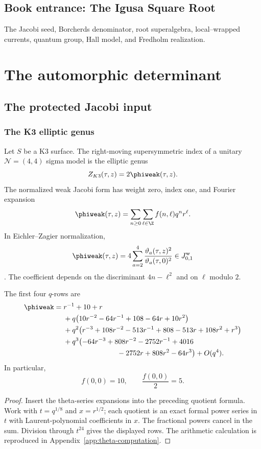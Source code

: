 \cleardoublepage
{}
{}
\chapter*{Book entrance: The Igusa Square Root}
\begin{summarybox}
The Jacobi seed, Borcherds denominator, root superalgebra, local--wrapped currents, quantum group, Hall model, and Fredholm realization.
\end{summarybox}
\part{The automorphic determinant}

\chapter{The protected Jacobi input}
\section{The K3 elliptic genus}
Let $S$ be a K3 surface. The right-moving supersymmetric index of a unitary $\mathcal N=(4,4)$ sigma model is the elliptic genus
\[
 Z_{K3}(\tau,z)=2\phiweak(\tau,z).
\]
The normalized weak Jacobi form has weight zero, index one, and Fourier expansion
\[
 \phiweak(\tau,z)=\sum_{n\ge0}\sum_{\ell\in\Z}f(n,\ell)q^nr^\ell.
\]
In Eichler--Zagier normalization,
\[
 \phiweak(\tau,z)=4\sum_{a=2}^{4}
 \frac{\vartheta_a(\tau,z)^2}{\vartheta_a(\tau,0)^2}
 \in J^{\mathrm w}_{0,1}
\]
\cite{EZ}. The coefficient depends on the discriminant $4n-\ell^2$ and on $\ell$ modulo $2$.

\begin{theorem}
The first four $q$-rows are
\[
\begin{aligned}
\phiweak={}&r^{-1}+10+r\\
&+q\bigl(10r^{-2}-64r^{-1}+108-64r+10r^2\bigr)\\
&+q^2\bigl(r^{-3}+108r^{-2}-513r^{-1}+808-513r+108r^2+r^3\bigr)\\
&+q^3\bigl(-64r^{-3}+808r^{-2}-2752r^{-1}+4016\\
&\hspace{7.5em}{}-2752r+808r^2-64r^3\bigr)+O(q^4).
\end{aligned}
\]
In particular,
\[
 f(0,0)=10,
 \qquad \frac{f(0,0)}2=5.
\]
\end{theorem}
\begin{proof}
Insert the theta-series expansions into the preceding quotient formula. Work with $t=q^{1/8}$ and $x=r^{1/2}$; each quotient is an exact formal power series in $t$ with Laurent-polynomial coefficients in $x$. The fractional powers cancel in the sum. Division through $t^{24}$ gives the displayed rows. The arithmetic calculation is reproduced in Appendix~\ref{app:theta-computation}.
\end{proof}

